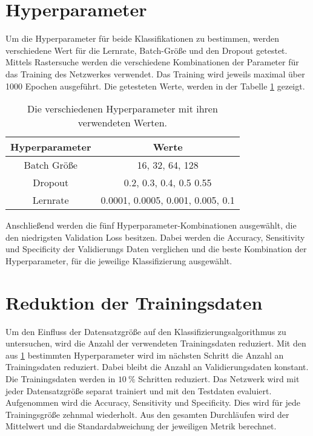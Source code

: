 \section{Hyperparameter}\label{sec:Hyperparameter}
Um die Hyperparameter für beide Klassifikationen zu bestimmen, werden verschiedene Wert für die
Lernrate, Batch-Größe und den Dropout getestet.
Mittels Rastersuche werden die verschiedene Kombinationen der Parameter für das Training des Netzwerkes verwendet. 
Das Training wird jeweils maximal über 1000 Epochen ausgeführt.
Die getesteten Werte, werden in der Tabelle \ref{tab:Hypp} gezeigt.

\begin{table}[htbp]
    \centering
    \begin{tabular}{c c}
        \toprule
        Hyperparameter     & Werte \\
        \midrule
        Batch Größe    & 16, 32, 64, 128   \\
        Dropout        & 0.2, 0.3, 0.4, 0.5 0.55   \\
        Lernrate       & 0.0001, 0.0005, 0.001, 0.005, 0.1   \\
        \bottomrule
  \end{tabular}
  \caption{Die verschiedenen Hyperparameter mit ihren verwendeten Werten.}
  \label{tab:Hypp}
\end{table}
Anschließend werden die fünf Hyperparameter-Kombinationen ausgewählt, die den niedrigsten Validation Loss besitzen.
Dabei werden die Accuracy, Sensitivity und Specificity der Validierungs Daten verglichen und die beste Kombination der Hyperparameter, 
für die jeweilige Klassifizierung ausgewählt.  

\section{Reduktion der Trainingsdaten}\label{sec:Red1}
Um den Einfluss der Datensatzgröße auf den Klassifizierungsalgorithmus zu untersuchen, wird die Anzahl der verwendeten Trainingsdaten reduziert.
Mit den aus \ref{sec:Hyperparameter} bestimmten Hyperparameter wird im nächsten Schritt die Anzahl an Trainingsdaten reduziert.
Dabei bleibt die Anzahl an Validierungsdaten konstant.
Die Trainingsdaten werden in $\qty{10}{\%}$ Schritten reduziert. 
Das Netzwerk wird mit jeder Datensatzgröße separat trainiert und mit den Testdaten evaluiert. 
Aufgenommen wird die Accuracy, Sensitivity und Specificity.
Dies wird für jede Trainingsgröße zehnmal wiederholt.
Aus den gesamten Durchläufen wird der Mittelwert und die Standardabweichung der jeweiligen Metrik berechnet.


